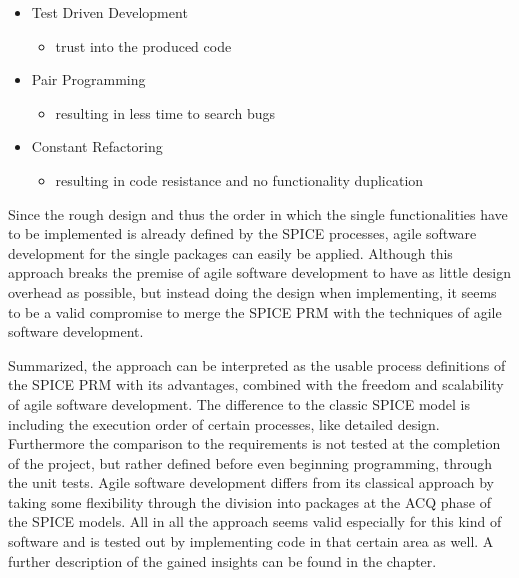 \begin{itemize}
 \item Test Driven Development
 \begin{itemize}
  \item trust into the produced code
 \end{itemize}

 \item Pair Programming
 \begin{itemize}
  \item resulting in less time to search bugs
 \end{itemize}
 
 \item Constant Refactoring
 \begin{itemize}
  \item resulting in code resistance and no functionality duplication
 \end{itemize}
\end{itemize}

Since the rough design and thus the order in which the single functionalities have to be implemented is already defined by the SPICE processes,
agile software development for the single packages can easily be applied. Although this approach breaks the premise of agile software 
development to have as little design overhead as possible, but instead doing the design when implementing, it seems to be a valid compromise to 
merge the SPICE PRM with the techniques of agile software development. 

Summarized, the approach can be interpreted as the usable process definitions of the SPICE PRM with its advantages, combined with the freedom 
and scalability of agile software development. The difference to the classic SPICE model is including the execution order of certain processes, 
like detailed design. Furthermore the comparison to the requirements is not tested at the completion of the project, but rather defined before 
even beginning programming, through the unit tests. Agile software development differs from its classical approach by taking some flexibility 
through the division into packages at the ACQ phase of the SPICE models. All in all the approach seems valid especially for this kind of 
software and is tested out by implementing code in that certain area as well. A further description of the gained insights can be found in the 
 chapter.

